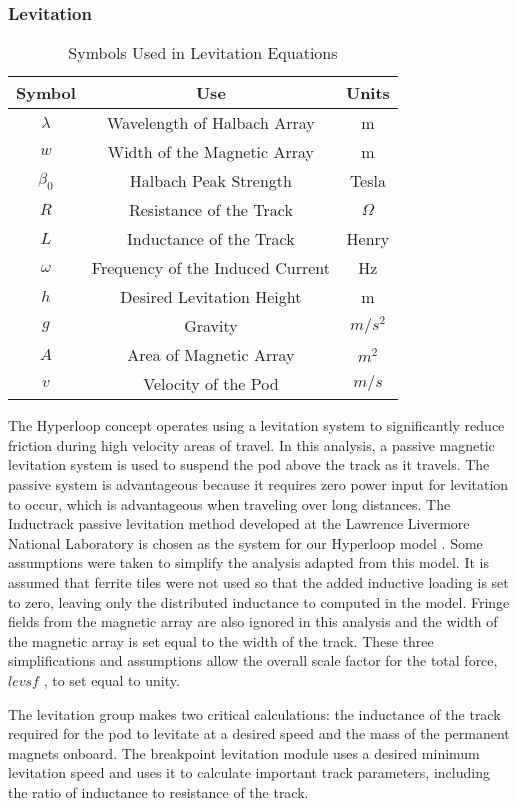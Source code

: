 \subsubsection{Levitation}
	\begin{table}[ht]
	\caption{Symbols Used in Levitation Equations}
	\centering
	\begin{tabular}{c c c}
	\hline\hline
	Symbol & Use & Units\\ [0.5ex]
	\hline
	$\lambda$ & Wavelength of Halbach Array & m\\
	$w$ & Width of the Magnetic Array & m\\
	$\beta _{0}$ & Halbach Peak Strength & Tesla\\
	$R$ & Resistance of the Track & $\Omega$\\
	$L$ & Inductance of the Track & Henry\\
	$\omega$ & Frequency of the Induced Current & Hz\\
	$h$ & Desired Levitation Height & m\\
	$g$ & Gravity & $m/s^{2}$\\
	$A$ & Area of Magnetic Array & $m^{2}$\\
	$v$ & Velocity of the Pod & $m/s$\\ [1ex]
	\hline
	\end{tabular}
	\label{table:nonlin}
	\end{table}
	The Hyperloop concept operates using a levitation system to significantly reduce friction during high velocity areas of travel. In this analysis, a passive magnetic levitation system is used to suspend the pod above the track as it travels. The passive system is advantageous because it requires zero power input for levitation to occur, which is advantageous when traveling over long distances. The Inductrack passive levitation method developed at the Lawrence Livermore National Laboratory is chosen as the system for our Hyperloop model \cite{inductrack}. Some assumptions were taken to simplify the analysis adapted from this model. It is assumed that ferrite tiles were not used so that the added inductive loading is set to zero, leaving only the distributed inductance to computed in the model. Fringe fields from the magnetic array are also ignored in this analysis and the width of the magnetic array is set equal to the width of the track. These three simplifications and assumptions allow the overall scale factor for the total force, $levsf$ , to set equal to unity.

	The levitation group makes two critical calculations: the inductance of the track required for the pod to levitate at a desired speed and the mass of the permanent magnets onboard. The breakpoint levitation module uses a desired minimum levitation speed and uses it to calculate important track parameters, including the ratio of inductance to resistance of the track.

